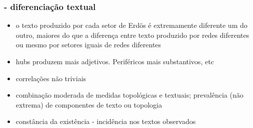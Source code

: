 \documentclass[10pt]{beamer}
\begin{document}
\begin{frame}
\frametitle{- diferenciação textual}
\begin{itemize}
	\item o texto produzido por cada setor de Erdös é extremamente diferente um do outro, maiores do que a diferença entre texto produzido por redes diferentes ou mesmo por setores iguais de redes diferentes
	\item hubs produzem mais adjetivos. Periféricos mais substantivos, etc
	\item correlações não triviais
	\item combinação moderada de medidas topológicas e textuais; prevalência (não extrema) de componentes de texto ou topologia
	\item constância da existência - incidência nos textos observados
\end{itemize}
\end{frame}
\end{document}
